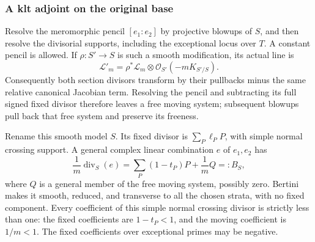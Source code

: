 \documentclass[11pt,letterpaper]{article}
\theoremstyle{definition}
\theoremstyle{remark}
\begin{document}
\subsubsection{A klt adjoint on the original base}

Resolve the meromorphic pencil \([e_1:e_2]\) by projective blowups
of \(S\), and then resolve the divisorial supports, including the
exceptional locus over \(T\). A constant pencil is allowed. If
\(\rho:S'\to S\) is such a smooth modification, its actual line is
\begin{equation}\label{pos:base-canonical-transform}
 \mathcal L'_m
 =\rho^*\mathcal L_m\otimes\mathcal{O}_{S'}(-mK_{S'/S}).
\end{equation}
Consequently both section divisors transform by their pullbacks minus
the same relative canonical Jacobian term. Resolving the pencil and
subtracting its full signed fixed divisor therefore leaves a free
moving system; subsequent blowups pull back that free system and
preserve its freeness.

Rename this smooth model \(S\). Its fixed divisor is
\(\sum_P\ell_PP\), with simple normal crossing support. A general
complex linear combination \(e\) of \(e_1,e_2\) has
\begin{equation}\label{pos:crepant-boundary-upstairs}
 \frac1m\operatorname{div}_S(e)
 =\sum_P(1-t_P)P+\frac1mQ=:B_S,
\end{equation}
where \(Q\) is a general member of the free moving system, possibly
zero. Bertini makes it smooth, reduced, and transverse to all the
chosen strata, with no fixed component. Every coefficient of this
simple normal crossing divisor is strictly less than one: the fixed
coefficients are \(1-t_P<1\), and the moving coefficient is
\(1/m<1\). The fixed coefficients over exceptional primes may be
negative.
\end{document}
